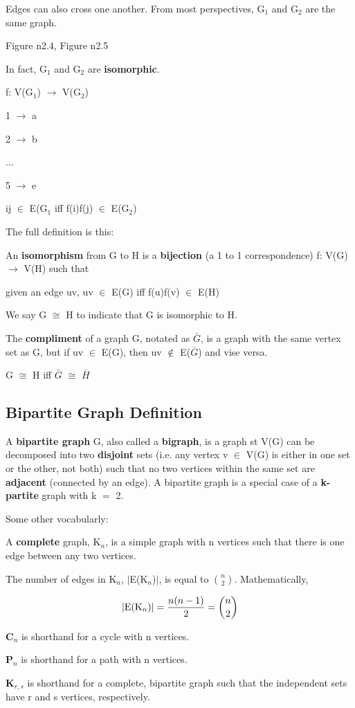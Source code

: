 \documentclass{article}
\newcommand{\mt}[1]{\ensuremath{#1}}
\newcommand\ssc[2][\DefaultOpt]{%
  \def\DefaultOpt{#2}%
  \subsection[#1]{#2}%
}
\newcommand{\mem}{\mt{\in} }
\newcommand{\lra}{ \mt{\longrightarrow} } %
\newcommand{\av}[1]{\mt{|}#1\mt{|}}  %
\newcommand{\eql}{ \mt{\operatorname{=}} }
\newcommand{\uw}[2]{#1\mt{_{#2}}}
\newcommand{\nck}[2]{\mt{{#1 \choose #2}}}
\newcommand{\eqn}[1]{\[#1\]}
\begin{document}
Edges can also cross one another. From most perspectives, \uw{G}{1} and \uw{G}{2} are the same graph.

Figure n2.4, Figure n2.5

In fact, \uw{G}{1} and \uw{G}{2} are \textbf{isomorphic}.

f: V(\uw{G}{1}) \lra V(\uw{G}{2})

1 \lra a

2 \lra b

...

5 \lra e

ij \mem E(\uw{G}{1} iff f(i)f(j) \mem E(\uw{G}{2})

The full definition is this:

An \textbf{isomorphism} from G to H is a \textbf{bijection} (a 1 to 1 correspondence) f: V(G) \lra V(H) such that

given an edge uv, uv \mem E(G) iff f(u)f(v) \mem E(H)

We say G $\cong$ H to indicate that G is isomorphic to H.

The \textbf{compliment} of a graph G, notated as $\bar G$, is a graph with the same vertex set as G, but if uv \mem E(G), then uv $\not\in$ E($\bar G$) and vise versa.

G $\cong$ H iff $\bar G$ $\cong$ $\bar H$

\ssc{Bipartite Graph Definition}{

A \textbf{bipartite graph} G, also called a \textbf{bigraph}, is a graph st V(G) can be decomposed into two \textbf{disjoint} sets (i.e. any vertex v \mem V(G) is either in one set or the other, not both) such that no two vertices within the same set are \textbf{adjacent} (connected by an edge). A bipartite graph is a special case of a \textbf{k-partite} graph with k\eql 2.

}

Some other vocabularly:

A \textbf{complete} graph, \uw{K}{n}, is a simple graph with n vertices such that there is one edge between any two vertices.

The number of edges in \uw{K}{n}, \av{E(\uw{K}{n})}, is equal to \nck{n}{2}. Mathematically,

\eqn{|\textrm{E(\uw{K}{n})}| = \frac{n(n - 1)}{2} = \nck{n}{2}}

\textbf{\uw{C}{n}} is shorthand for a cycle with n vertices.

\textbf{\uw{P}{n}} is shorthand for a path with n vertices.

\textbf{\uw{K}{r, s}} is shorthand for a complete, bipartite graph such that the independent sets have r and s vertices, respectively.
\end{document}
